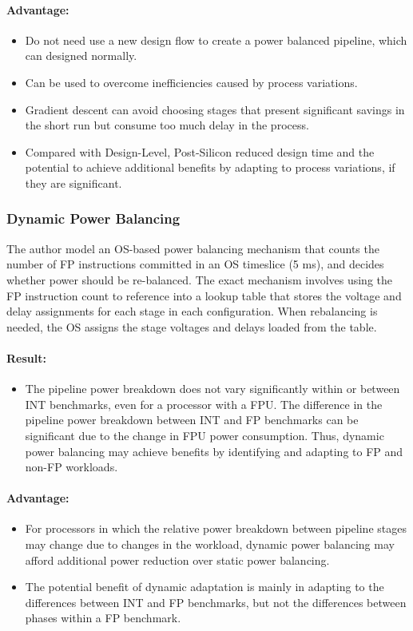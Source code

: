 \documentclass[10pt,a4paper]{article}
\begin{document}
\paragraph{Advantage:}
\begin{itemize}
    \item Do not need use a new design flow to create a power balanced pipeline, which can designed normally.
    \item Can be used to overcome inefficiencies caused by process variations.
    \item Gradient descent can avoid choosing stages that present significant savings in the short run but consume too much delay in the process.
    \item Compared with Design-Level, Post-Silicon reduced design time and the potential to achieve additional benefits by adapting to process variations, if they are significant.
\end{itemize}

\subsubsection{Dynamic Power Balancing}
The author model an OS-based power balancing mechanism that counts the number of FP instructions committed in an OS timeslice (5 ms), and decides whether power should be re-balanced. The exact mechanism involves using the FP instruction count to reference into a lookup table that stores the voltage and delay assignments for each stage in each configuration. When rebalancing is needed, the OS assigns the stage voltages and
delays loaded from the table.
\paragraph{Result:} 
\begin{itemize}
    \item The pipeline power breakdown does not vary significantly within or between INT benchmarks, even for a processor with a FPU. The difference in the pipeline power breakdown between INT and FP benchmarks can be significant due to the change in
    FPU power consumption. Thus, dynamic power balancing may achieve benefits by identifying and adapting to FP and non-FP workloads. 
\end{itemize}

\paragraph{Advantage:}
\begin{itemize}
    \item For processors in which the relative power breakdown between pipeline stages may change due to changes in the workload, dynamic power balancing may afford additional power reduction over static power balancing.
    \item The potential benefit of dynamic adaptation is mainly in adapting to the
    differences between INT and FP benchmarks, but not the differences between phases within a FP benchmark.
\end{itemize}
\end{document}
